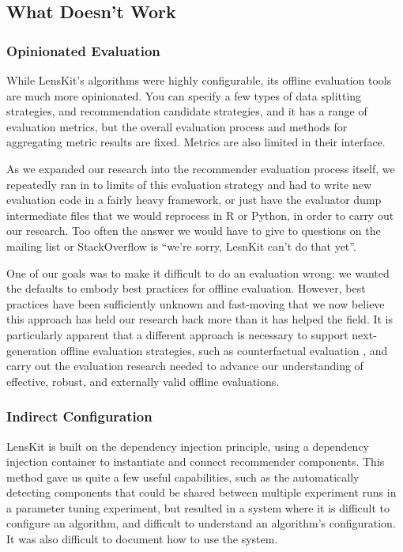 \subsection{What Doesn't Work}

\subsubsection{Opinionated Evaluation}
While LensKit's algorithms were highly configurable, its offline evaluation tools are much more opinionated.
You can specify a few types of data splitting strategies, and recommendation candidate strategies, and it has a range of evaluation metrics, but the overall evaluation process and methods for aggregating metric results are fixed.
Metrics are also limited in their interface.

As we expanded our research into the recommender evaluation process itself, we repeatedly ran in to limits of this evaluation strategy and had to write new evaluation code in a fairly heavy framework, or just have the evaluator dump intermediate files that we would reprocess in R or Python, in order to carry out our research.
Too often the answer we would have to give to questions on the mailing list or StackOverflow is ``we're sorry, LesnKit can't do that yet''.

One of our goals was to make it difficult to do an evaluation wrong: we wanted the defaults to embody best practices for offline evaluation.
However, best practices have been sufficiently unknown and fast-moving that we now believe this approach has held our research back more than it has helped the field.
It is particularly apparent that a different approach is necessary to support next-generation offline evaluation strategies, such as counterfactual evaluation \citep{Bottou2013-mn}, and carry out the evaluation research needed to advance our understanding of effective, robust, and externally valid offline evaluations.

\subsubsection{Indirect Configuration}

LensKit is built on the dependency injection principle, using a dependency injection container \citep{Ekstrand2016-dl} to instantiate and connect recommender components.
This method gave us quite a few useful capabilities, such as the automatically detecting components that could be shared between multiple experiment runs in a parameter tuning experiment, but resulted in a system where it is difficult to configure an algorithm, and difficult to understand an algorithm's configuration.
It was also difficult to document how to use the system.

